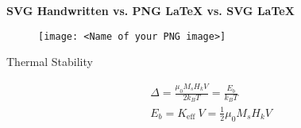 
\begin{center}
\Large\textbf{SVG Handwritten vs. PNG LaTeX vs. SVG LaTeX}
\end{center}

\begin{figure}[htbp]
    \centering
    


\begin{center}
\space
\end{center}

\texttt{[image: 
<Name of your PNG image>]}
\end{figure}

\begin{center}
Thermal Stability
\end{center}

$$
\begin{aligned}
& \Delta=\frac{\mu_0 M_s H_k V}{2 k_B T}=\frac{E_b}{k_B T} \\
& E_b=K_{\text {eff }} V=\frac{1}{2} \mu_0 M_s H_k V
\end{aligned}
$$
